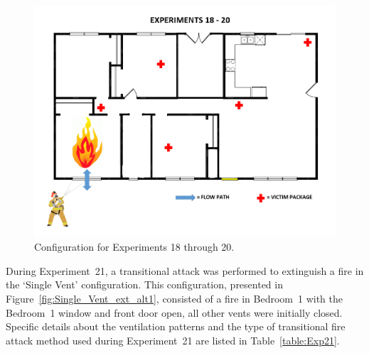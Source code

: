 \documentclass[12pt,oneside]{book}
\begin{document}
\begin{figure}[H]
	\centering
	\includegraphics[width=5in]{Figures/General/Exps18through20.png}
	\caption{Configuration for Experiments 18 through 20.}
	\label{fig:Single_Vent_ext}
\end{figure}

\begin{table}[H]
\caption{Experiments 18 through 20}
\centering
{}
\label{table:Exp18to20}
\end{table}

\FloatBarrier

During Experiment~21, a transitional attack was performed to extinguish a fire in the `Single Vent' configuration. This configuration, presented in Figure~\ref{fig:Single_Vent_ext_alt1}, consisted of a fire in Bedroom~1 with the Bedroom~1 window and front door open, all other vents were initially closed. Specific details about the ventilation patterns and the type of transitional fire attack method used during Experiment~21 are listed in Table~\ref{table:Exp21}.
\end{document}
